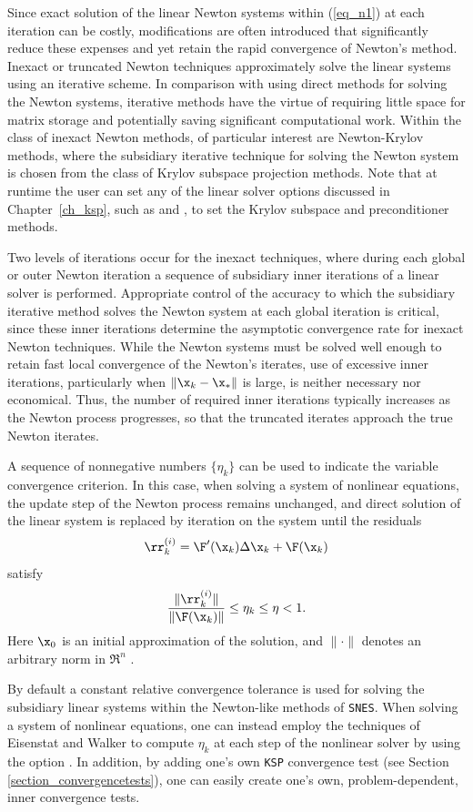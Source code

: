Since exact solution of the linear Newton systems within (\ref{eq_n1})
at each iteration can be costly, modifications
are often introduced that significantly reduce these expenses and
yet retain the rapid convergence of Newton's method.  Inexact or
truncated Newton techniques approximately solve the linear systems
using an iterative scheme.  In comparison with using direct methods
for solving the Newton systems, iterative methods have the virtue
of requiring little space for matrix storage and potentially saving
significant computational work.  Within the class of inexact Newton
methods, of particular interest are Newton-Krylov methods, where the
subsidiary iterative technique for solving the Newton system is
chosen from the class of Krylov subspace projection methods.
Note that at runtime the user can set any of the linear solver
options discussed in Chapter~\ref{ch_ksp}, such as
 and ,
to set the Krylov subspace and preconditioner methods.

Two levels of iterations occur for the inexact techniques, where
during each global or outer Newton iteration a sequence of
subsidiary inner iterations of a linear solver is performed.
Appropriate control of the accuracy to which the subsidiary
iterative method solves the Newton system
at each global iteration is critical, since these
inner iterations determine the asymptotic convergence rate for
inexact Newton techniques.
While the Newton systems must be solved well enough to retain
fast local convergence of the Newton's iterates, use of excessive
inner iterations, particularly when $ \| \x_k - \x_* \| $ is large,
is neither necessary nor economical.
Thus, the number of required inner iterations typically increases
as the Newton process progresses, so that the truncated iterates
approach the true Newton iterates.

A sequence of nonnegative numbers $ \{\eta_k\} $ can be used to
indicate the variable convergence criterion.
In this case, when solving a system of nonlinear equations, the
update step of the Newton process remains unchanged, and direct
solution of the linear system is replaced by iteration on the
system until the residuals
\[  \rr_k^{(i)} =  \F'(\x_k) \Delta \x_k + \F(\x_k) \]
satisfy
\[  \frac{ \| \rr_k^{(i)} \| }{ \| \F(\x_k) \| } \leq \eta_k \leq \eta < 1. \]
Here $ \x_0 $ is an initial approximation of the solution, and
$ \| \cdot \| $ denotes an arbitrary norm in $ \Re^n $ .

By default a constant relative convergence tolerance is used for
solving the subsidiary linear systems within the Newton-like methods
of \lstinline{SNES}.  When solving a system of nonlinear equations, one can
instead employ the techniques of Eisenstat and Walker \cite{EW96}
to compute $ \eta_k $ at each step of the nonlinear solver by using the
option  . In addition,
by adding one's own \lstinline{KSP} convergence test (see Section
\ref{section_convergencetests}), one can easily create one's own,
problem-dependent, inner convergence tests.


